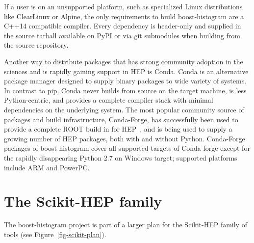 \documentclass{webofc}
\begin{document}
If a user is on an unsupported platform, such as specialized Linux distributions like ClearLinux or Alpine, the only requirements to build boost-histogram are a C++14 compatible compiler. Every dependency is header-only and supplied in the source tarball available on PyPI or via git submodules when building from the source repository.

Another way to distribute packages that has strong community adoption in the sciences and is rapidly gaining support in HEP is Conda. Conda is an alternative package manager designed to supply binary packages to wide variety of systems. In contrast to pip, Conda never builds from source on the target machine, is less Python-centric, and provides a complete compiler stack with minimal dependencies on the underlying system. The most popular community source of packages and build infrastructure, Conda-Forge, has successfully been used to provide a complete ROOT build in for HEP~\cite{Burr:2019chep}, and is being used to supply a growing number of HEP packages, both with and without Python. Conda-Forge packages of boost-histogram cover all supported targets of Conda-forge except for the rapidly disappearing Python 2.7 on Windows target; supported platforms include ARM and PowerPC.

\section{The Scikit-HEP family}
\label{sec-3}

The boost-histogram project is part of a larger plan for the Scikit-HEP family of tools (see Figure~\ref{fig-scikit-plan}).
\end{document}
